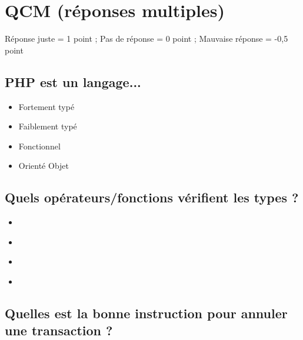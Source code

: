 \documentclass[11pt,a4paper]{article}
\begin{document}
\MakeExamTitle                   %


\section{QCM (réponses multiples)}

\medskip

Réponse juste = 1 point ; Pas de réponse = 0 point ; Mauvaise réponse = -0,5 point

\medskip

\subsection{PHP est un langage...}

\begin{itemize}
\item[\CaseCoche] Fortement typé\\
\item[\CaseCoche] Faiblement typé\\
\item[\CaseCoche] Fonctionnel\\
\item[\CaseCoche] Orienté Objet\\
\end{itemize}


\subsection{Quels opérateurs/fonctions vérifient les types ?}

\begin{itemize}
\item[\CaseCoche] \TTBF{==} \\
\item[\CaseCoche]  \\
\item[\CaseCoche]  \\
\item[\CaseCoche]  \\
\end{itemize}


\subsection{Quelles est la bonne instruction pour annuler une transaction ?}
\end{document}
